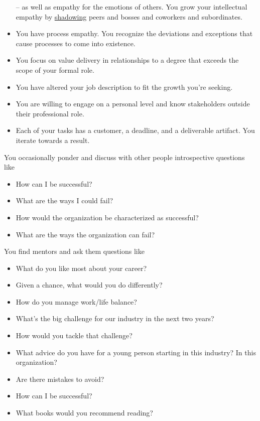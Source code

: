 \begin{itemize}
    -- as well as empathy for the emotions of others. You grow your intellectual empathy by 
    \href{https://en.wikipedia.org/wiki/Job_shadow}{shadowing} 
    peers and bosses and coworkers and subordinates.
    \item You have \gls{process empathy}. You recognize the deviations and exceptions that cause processes to come into existence. 
    \item You focus on value delivery in relationships to a degree that exceeds the scope of your formal role.
\item You have altered your job description to fit the growth you're seeking.
\item You are willing to engage on a personal level and know stakeholders outside their professional role.
\item Each of your tasks has a customer, a deadline, and a deliverable artifact. You iterate towards a result. 
\end{itemize}

You occasionally ponder and discuss with other people introspective questions like
\begin{itemize}
    \item How can I be successful?
    \item What are the ways I could fail?
    \item How would the organization be characterized as successful?
    \item What are the ways the organization can fail?
\end{itemize}
You find mentors and ask them questions like
\begin{itemize}
    \item What do you like most about your career? 
    \item Given a chance, what would you do differently?
    \item How do you manage work/life balance?
    \item What's the big challenge for our industry in the next two years?
    \item How would you tackle that challenge?
    \item What advice do you have for a young person starting in this industry? In this organization? 
    \item Are there mistakes to avoid?  
    \item How can I be successful?
    \item What books would you recommend reading?
\end{itemize}

